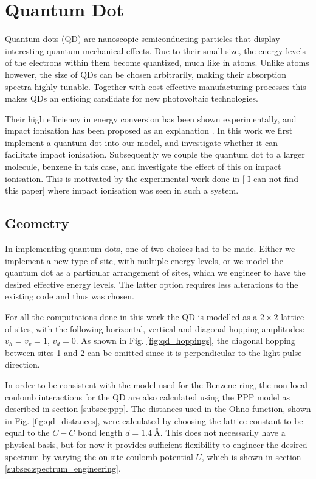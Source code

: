 \section{Quantum Dot}

Quantum dots (QD) are nanoscopic semiconducting particles that display interesting quantum mechanical effects. Due to their small size, the energy levels of the electrons within them become quantized, much like in atoms. Unlike atoms however, the size of QDs can be chosen arbitrarily, making their absorption spectra highly tunable.  Together with cost-effective manufacturing processes this makes QDs an enticing candidate for new photovoltaic technologies.
\medskip

Their high efficiency in energy conversion has been shown experimentally, and impact ionisation has been proposed as an explanation \cite{impact_io_in_qd}. In this work we first implement a quantum dot into our model, and investigate whether it can facilitate impact ionisation. Subsequently we couple the quantum dot to a larger molecule, benzene in this case, and investigate the effect of this on impact ionisation. This is motivated by the experimental work done in [{\color{red} I can not find this paper}] where impact ionisation was seen in such a system.

\subsection{Geometry}
 
 In implementing quantum dots, one of two choices had to be made. Either we implement a new type of site, with multiple energy levels, or we model the quantum dot as a particular arrangement of sites, which we engineer to have the desired effective energy levels. The latter option requires less alterations to the existing code and thus was chosen.
 
 \medskip
 
 For all the computations done in this work the QD is modelled as a $2\times 2$ lattice of sites, with the following horizontal, vertical and diagonal hopping amplitudes: $v_h = v_v = 1$, $v_d = 0$. As shown in Fig. \ref{fig:qd_hoppings}, the diagonal hopping between sites 1 and 2 can be omitted since it is perpendicular to the light pulse direction.
 
 \medskip
 
 In order to be consistent with the model used for the Benzene ring, the non-local coulomb interactions for the QD are also calculated using the PPP model as described in section \ref{subsec:ppp}. The distances used in the Ohno function, shown in Fig.
 \ref{fig:qd_distances}, were calculated by choosing the lattice constant to be equal to the $C-C$ bond length $d =\SI{1.4}{\angstrom}$. This does not necessarily have a physical basis, but for now it provides sufficient flexibility to engineer the desired spectrum by varying the on-site coulomb potential $U$, which is shown in section \ref{subsec:spectrum_engineering}.
 
